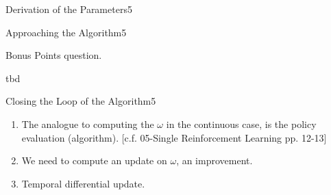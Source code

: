 \begin{questions}
\begin{question}{Derivation of the Parameters}{5}
	\begin{answer}
	\end{answer}
\end{question}

\begin{question}{Approaching the Algorithm}{5}
	
	Bonus Points question.
	\begin{answer}
		
		tbd
	\end{answer}
\end{question}


\begin{question}{Closing the Loop of the Algorithm}{5}
	
	\begin{answer}
		\begin{enumerate}
			\item	The analogue to computing the $\omega$ in the continuous case, is the policy evaluation (algorithm). [c.f. 05-Single Reinforcement Learning pp. 12-13]
			\item	We need to compute an update on $\omega$, an improvement.
			\item	Temporal differential update.
		\end{enumerate}

	\end{answer}
\end{question}

\end{questions}
